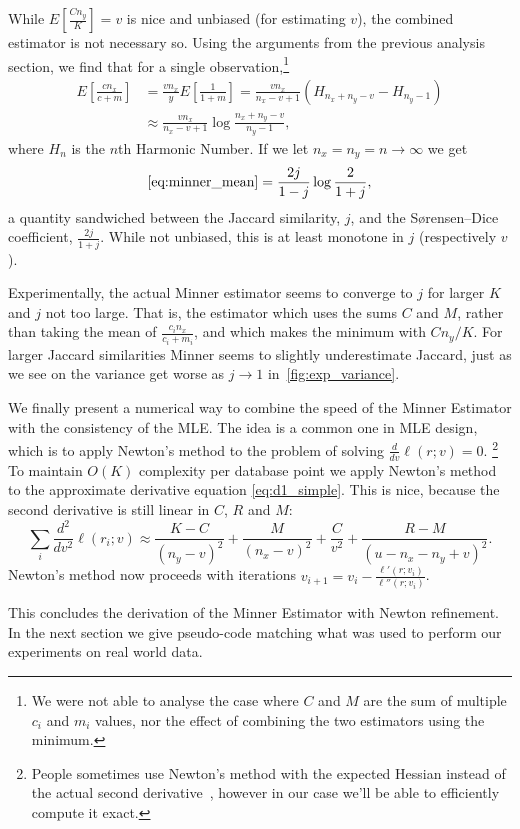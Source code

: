 While $E[\frac{C n_y}{K}] = v$ is nice and unbiased (for estimating $v$), the combined estimator is not necessary so.
Using the arguments from the previous analysis section, we find that for a single observation,\footnote{We were not able to analyse the case where $C$ and $M$ are the sum of multiple $c_i$ and $m_i$ values, nor the effect of combining the two estimators using the minimum.}
\begin{align}
   E[\frac{c n_x}{c+m}]
   &= \frac{v n_x}{y} E[\frac{1}{1+m}]
   = \frac{v n_x}{n_x-v+1} (H_{n_x+n_y-v} - H_{n_y-1})
 \\&\approx \frac{v n_x}{n_x-v+1} \log\frac{n_x+n_y-v}{n_y-1},
 \label{eq:minner_mean}
\end{align}
where $H_n$ is the $n$th Harmonic Number.
If we let $n_x=n_y=n\to \infty$ we get
\[\eqref{eq:minner_mean} = \frac{2j}{1-j}\log\frac{2}{1+j},\]
a quantity sandwiched between the Jaccard similarity, $j$, and the Sørensen–Dice coefficient, $\frac{2j}{1+j}$.
While not unbiased, this is at least monotone in $j$ (respectively $v$).

Experimentally, the actual Minner estimator seems to converge to $j$ for larger $K$ and $j$ not too large.
That is, the estimator which uses the sums $C$ and $M$, rather than taking the mean of $\frac{c_i n_x}{c_i+m_i}$, and which makes the minimum with $Cn_y/K$.
For larger Jaccard similarities Minner seems to slightly underestimate Jaccard, just as we see on the variance get worse as $j\to1$ in~\cref{fig:exp_variance}.

\smallskip

We finally present a numerical way to combine the speed of the Minner Estimator with the consistency of the MLE.
The idea is a common one in MLE design, which is to apply Newton's method to the problem of solving $\frac{d}{dv}\ell(r;v)=0$.%
\footnote{People sometimes use Newton's method with the expected Hessian instead of the actual second derivative~\cite{longford1987fast}, however in our case we'll be able to efficiently compute it exact.}
To maintain $O(K)$ complexity per database point we apply Newton's method to the approximate derivative equation \cref{eq:d1_simple}.
This is nice, because the second derivative is still linear in $C$, $R$ and $M$:
\[
   \sum_i\frac{d^2}{dv^2}\ell(r_i; v) \approx
   \frac{K-C}{(n_y-v)^2} 
   +\frac{M}{(n_x-v)^2} 
   +\frac{C}{v^2}
   +\frac{R-M}{(u-n_x-n_y+v)^2}
   .
   \label{eq:d2_simple}
\]
Newton's method now proceeds with iterations
$v_{i+1} = v_i - \frac{\ell'(r; v_i)}{\ell''(r; v_i)}$.

This concludes the derivation of the Minner Estimator with Newton refinement.
In the next section we give pseudo-code matching what was used to perform our experiments on real world data.

